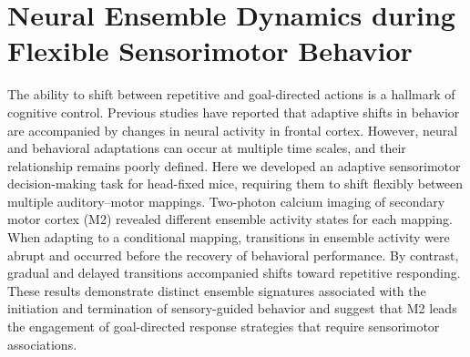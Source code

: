 \chapter{Neural Ensemble Dynamics during Flexible Sensorimotor Behavior}


The ability to shift between repetitive and goal-directed actions is a hallmark of cognitive control. Previous studies have reported that adaptive shifts in behavior are accompanied by changes in neural activity in frontal cortex. However, neural and behavioral adaptations can occur at multiple time scales, and their relationship remains poorly defined. Here we developed an adaptive sensorimotor decision-making task for head-fixed mice, requiring them to shift flexibly between multiple auditory–motor mappings. Two-photon calcium imaging of secondary motor cortex (M2) revealed different ensemble activity states for each mapping. When adapting to a conditional mapping, transitions in ensemble activity were abrupt and occurred before the recovery of behavioral performance. By contrast, gradual and delayed transitions accompanied shifts toward repetitive responding. These results demonstrate distinct ensemble signatures associated with the initiation and termination of sensory-guided behavior and suggest that M2 leads the engagement of goal-directed response strategies that require sensorimotor associations.\\











